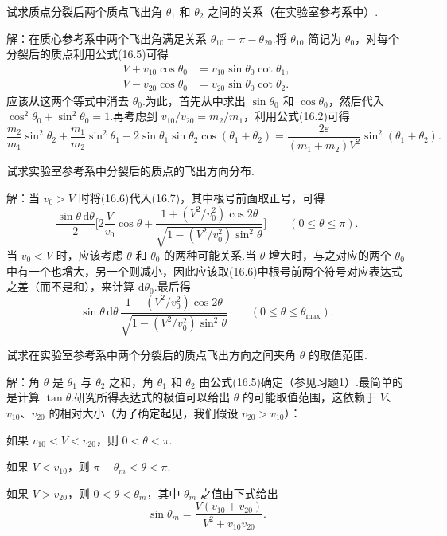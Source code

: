 \begin{xiti}

\quad 试求质点分裂后两个质点飞出角 $\theta_1$ 和 $\theta_2$ 之间的关系（在实验室参考系中）.

解：在质心参考系中两个飞出角满足关系 $\theta_{10}=\pi-\theta_{20}$.将 $\theta_{10}$ 简记为 $\theta_0$，对每个分裂后的质点利用公式(16.5)可得
\begin{equation*}
\begin{aligned}
  V+v_{10}\cos\theta_0&=v_{10}\sin\theta_0\cot\theta_1,\\
  V-v_{20}\cos\theta_0&=v_{20}\sin\theta_0\cot\theta_2.
\end{aligned}
\end{equation*}
应该从这两个等式中消去 $\theta_0$.为此，首先从中求出 $\sin\theta_0$ 和 $\cos\theta_0$，然后代入 $\cos^2\theta_0+\sin^2\theta_0=1$.再考虑到 $v_{10}/v_{20}=m_2/m_1$，利用公式(16.2)可得
\begin{equation*}
  \frac{m_2}{m_1}\sin^2\theta_2+\frac{m_1}{m_2}\sin^2\theta_1
  -2\sin\theta_1\sin\theta_2\cos(\theta_1+\theta_2)
  =\frac{2\varepsilon}{(m_1+m_2)V^2}\sin^2(\theta_1+\theta_2).
\end{equation*}

\quad 试求实验室参考系中分裂后的质点的飞出方向分布.

解：当 $v_0>V$ 时将(16.6)代入(16.7)，其中根号前面取正号，可得
\begin{equation*}
  \frac{\sin\theta\,\mathrm{d}\theta}{2}\bigg[2\frac{V}{v_0}\cos\theta
  +\frac{1+(V^2/v_0^2)\cos2\theta}{\sqrt{1-(V^2/v_0^2)\sin^2\theta}}\bigg]
  \qquad(0\leqslant\theta\leqslant\pi).
\end{equation*}
当 $v_0<V$ 时，应该考虑 $\theta$ 和 $\theta_0$ 的两种可能关系.当 $\theta$ 增大时，与之对应的两个 $\theta_0$ 中有一个也增大，另一个则减小，因此应该取(16.6)中根号前两个符号对应表达式之差（而不是和），来计算 $\mathrm{d}\theta_0$.最后得
\begin{equation*}
  \sin\theta\,\mathrm{d}\theta\,
  \frac{1+(V^2/v_0^2)\cos2\theta}{\sqrt{1-(V^2/v_0^2)\sin^2\theta}}
  \qquad(0\leqslant\theta\leqslant\theta_{\mathrm{max}}).
\end{equation*}

\quad 试求在实验室参考系中两个分裂后的质点飞出方向之间夹角 $\theta$ 的取值范围.

解：角 $\theta$ 是 $\theta_1$ 与 $\theta_2$ 之和，角 $\theta_1$ 和 $\theta_2$ 由公式(16.5)确定（参见习题1）.最简单的是计算 $\tan\theta$.研究所得表达式的极值可以给出 $\theta$ 的可能取值范围，这依赖于 $V$、$v_{10}$、$v_{20}$ 的相对大小（为了确定起见，我们假设 $v_{20}>v_{10}$）：

如果 $v_{10}<V<v_{20}$，则 $0<\theta<\pi$.

如果 $V<v_{10}$，则 $\pi-\theta_m<\theta<\pi$.

如果 $V>v_{20}$，则 $0<\theta<\theta_m$，其中 $\theta_m$ 之值由下式给出
\begin{equation*}
  \sin\theta_m=\frac{V(v_{10}+v_{20})}{V^2+v_{10}v_{20}}.
\end{equation*}

\end{xiti}

